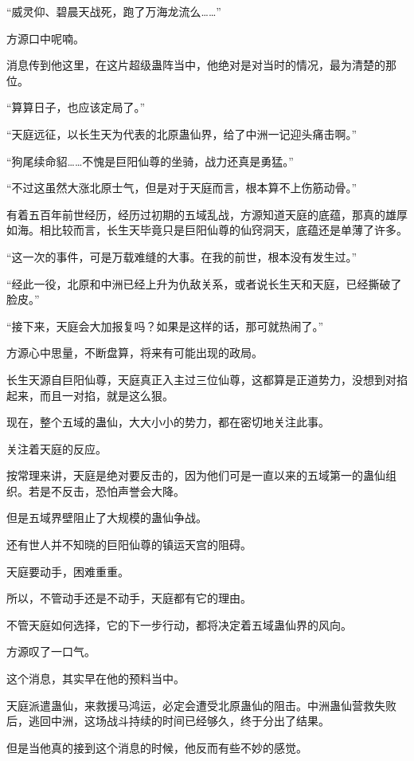 
\begin{this_body}

“威灵仰、碧晨天战死，跑了万海龙流么……”

方源口中呢喃。

消息传到他这里，在这片超级蛊阵当中，他绝对是对当时的情况，最为清楚的那位。

“算算日子，也应该定局了。”

“天庭远征，以长生天为代表的北原蛊仙界，给了中洲一记迎头痛击啊。”

“狗尾续命貂……不愧是巨阳仙尊的坐骑，战力还真是勇猛。”

“不过这虽然大涨北原士气，但是对于天庭而言，根本算不上伤筋动骨。”

有着五百年前世经历，经历过初期的五域乱战，方源知道天庭的底蕴，那真的雄厚如海。相比较而言，长生天毕竟只是巨阳仙尊的仙窍洞天，底蕴还是单薄了许多。

“这一次的事件，可是万载难缝的大事。在我的前世，根本没有发生过。”

“经此一役，北原和中洲已经上升为仇敌关系，或者说长生天和天庭，已经撕破了脸皮。”

“接下来，天庭会大加报复吗？如果是这样的话，那可就热闹了。”

方源心中思量，不断盘算，将来有可能出现的政局。

长生天源自巨阳仙尊，天庭真正入主过三位仙尊，这都算是正道势力，没想到对掐起来，而且一对掐，就是这么狠。

现在，整个五域的蛊仙，大大小小的势力，都在密切地关注此事。

关注着天庭的反应。

按常理来讲，天庭是绝对要反击的，因为他们可是一直以来的五域第一的蛊仙组织。若是不反击，恐怕声誉会大降。

但是五域界壁阻止了大规模的蛊仙争战。

还有世人并不知晓的巨阳仙尊的镇运天宫的阻碍。

天庭要动手，困难重重。

所以，不管动手还是不动手，天庭都有它的理由。

不管天庭如何选择，它的下一步行动，都将决定着五域蛊仙界的风向。

方源叹了一口气。

这个消息，其实早在他的预料当中。

天庭派遣蛊仙，来救援马鸿运，必定会遭受北原蛊仙的阻击。中洲蛊仙营救失败后，逃回中洲，这场战斗持续的时间已经够久，终于分出了结果。

但是当他真的接到这个消息的时候，他反而有些不妙的感觉。


\end{this_body}
